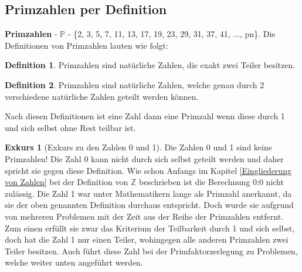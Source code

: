 \documentclass[12pt,a4paper]{article}
\theoremstyle{definition}
\newtheorem{defi}{Definition}[section]
\newtheorem{exkurs}{Exkurs}
\begin{document}
\subsection{Primzahlen per Definition}\label{Primzahlen per Definition}
\textbf{Primzahlen} - $\mathbb{P}$ - \{2, 3, 5, 7, 11, 13, 17, 19, 23, 29, 31, 37, 41, ..., pn\}.\newline
Die Definitionen von Primzahlen lauten wie folgt:
\begin{defi}Primzahlen sind natürliche Zahlen, die exakt zwei Teiler besitzen.\end{defi}
\begin{defi}Primzahlen sind natürliche Zahlen, welche genau durch 2 verschiedene natürliche Zahlen geteilt werden können.\end{defi}

Nach diesen Definitionen ist eine Zahl dann eine Primzahl wenn diese durch 1 und sich selbst ohne Rest teilbar ist.

\begin{exkurs}[Exkurs zu den Zahlen 0 und 1]
Die Zahlen 0 und 1 sind keine Primzahlen!
Die Zahl 0 kann nicht durch sich selbst geteilt werden und daher spricht sie gegen diese Definition.
Wie schon Anfangs im Kapitel \ref{Eingliederung von Zahlen} bei der Definition von $\mathbb{Z}$ beschrieben ist die Berechnung 0:0 nicht zulässig.\newline
Die Zahl 1 war unter Mathematikern lange als Primzahl anerkannt, da sie der oben genannten Definition durchaus entspricht.
Doch wurde sie aufgrund von mehreren Problemen mit der Zeit aus der Reihe der Primzahlen entfernt.
Zum einen erfüllt sie zwar das Kriterium der Teilbarkeit durch 1 und sich selbst, doch hat die Zahl 1 nur einen Teiler, wohingegen alle anderen Primzahlen zwei Teiler besitzen.
Auch führt diese Zahl bei der Primfaktorzerlegung zu Problemen, welche weiter unten angeführt werden.
\end{exkurs}
\end{document}
